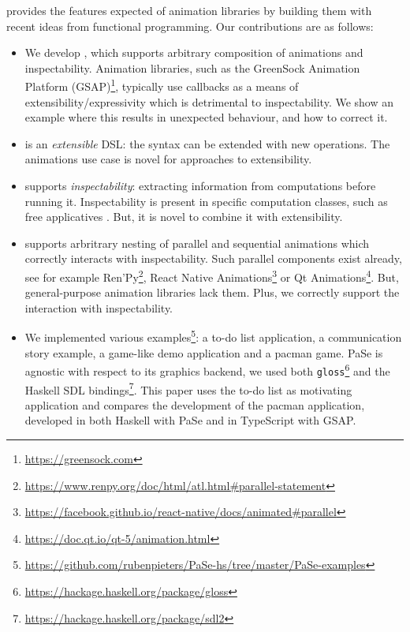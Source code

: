 \dsl{} provides the features expected of animation libraries by building them with recent ideas from functional programming. Our contributions are as follows:
\begin{itemize}
\item We develop \dsl{}, which supports arbitrary composition of animations and inspectability. Animation libraries, such as the GreenSock Animation Platform (GSAP)\footnote{\url{https://greensock.com}}, typically use callbacks as a means of extensibility/expressivity which is detrimental to inspectability. We show an example where this results in unexpected behaviour, and how to correct it.
\item \dsl{} is an \emph{extensible} DSL: the syntax can be extended with new operations. The animations use case is novel for approaches to extensibility.
\item \dsl{} supports \emph{inspectability}: extracting information from computations before running it. Inspectability is present in specific computation classes, such as free applicatives \cite{DBLP:journals/corr/CapriottiK14}. But, it is novel to combine it with extensibility.
\item \dsl{} supports arbritrary nesting of parallel and sequential animations which correctly interacts with inspectability. Such parallel components exist already, see for example Ren'Py\footnote{\url{https://www.renpy.org/doc/html/atl.html\#parallel-statement}}, React Native Animations\footnote{\url{https://facebook.github.io/react-native/docs/animated\#parallel}} or Qt Animations\footnote{\url{https://doc.qt.io/qt-5/animation.html}}. But, general-purpose animation libraries lack them. Plus, we correctly support the interaction with inspectability.
\item We implemented various examples\footnote{\url{https://github.com/rubenpieters/PaSe-hs/tree/master/PaSe-examples}}: a to-do list application, a communication story example, a game-like demo application and a pacman game. PaSe is agnostic with respect to its graphics backend, we used both \texttt{gloss}\footnote{\url{https://hackage.haskell.org/package/gloss}} and the Haskell SDL bindings\footnote{\url{https://hackage.haskell.org/package/sdl2}}. This paper uses the to-do list as motivating application and compares the development of the pacman application, developed in both Haskell with PaSe and in TypeScript with GSAP.
\end{itemize}
